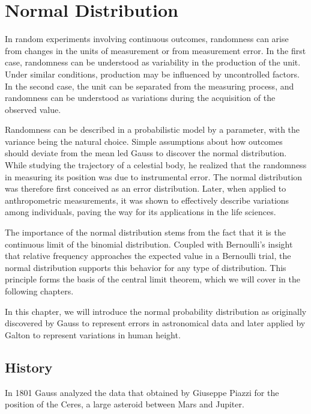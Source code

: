 \documentclass[
]{book}
\begin{document}
\hypertarget{normal-distribution}{%
\chapter{Normal Distribution}\label{normal-distribution}}

In random experiments involving continuous outcomes, randomness can arise from changes in the units of measurement or from measurement error. In the first case, randomness can be understood as variability in the production of the unit. Under similar conditions, production may be influenced by uncontrolled factors. In the second case, the unit can be separated from the measuring process, and randomness can be understood as variations during the acquisition of the observed value.

Randomness can be described in a probabilistic model by a parameter, with the variance being the natural choice. Simple assumptions about how outcomes should deviate from the mean led Gauss to discover the normal distribution. While studying the trajectory of a celestial body, he realized that the randomness in measuring its position was due to instrumental error. The normal distribution was therefore first conceived as an error distribution. Later, when applied to anthropometric measurements, it was shown to effectively describe variations among individuals, paving the way for its applications in the life sciences.

The importance of the normal distribution stems from the fact that it is the continuous limit of the binomial distribution. Coupled with Bernoulli's insight that relative frequency approaches the expected value in a Bernoulli trial, the normal distribution supports this behavior for any type of distribution. This principle forms the basis of the central limit theorem, which we will cover in the following chapters.

In this chapter, we will introduce the normal probability distribution as originally discovered by Gauss to represent errors in astronomical data and later applied by Galton to represent variations in human height.

\hypertarget{history}{%
\section{History}\label{history}}

In 1801 Gauss analyzed the data that obtained by Giuseppe Piazzi for the position of the Ceres, a large asteroid between Mars and Jupiter.
\end{document}
